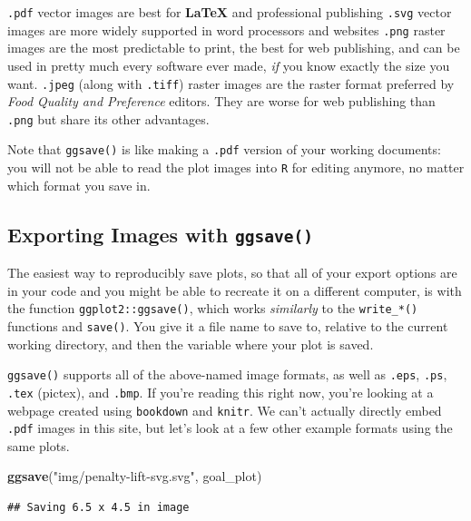 \documentclass[
]{book}
\newenvironment{Shaded}{\begin{snugshade}}{\end{snugshade}}
\newcommand{\FunctionTok}[1]{\textcolor[rgb]{0.13,0.29,0.53}{\textbf{#1}}}
\newcommand{\NormalTok}[1]{#1}
\newcommand{\StringTok}[1]{\textcolor[rgb]{0.31,0.60,0.02}{#1}}
\begin{document}
\texttt{.pdf} vector images are best for \textbf{LaTeX} and professional publishing
\texttt{.svg} vector images are more widely supported in word processors and websites
\texttt{.png} raster images are the most predictable to print, the best for web publishing, and can be used in pretty much every software ever made, \emph{if} you know exactly the size you want.
\texttt{.jpeg} (along with \texttt{.tiff}) raster images are the raster format preferred by \emph{Food Quality and Preference} editors. They are worse for web publishing than \texttt{.png} but share its other advantages.

Note that \texttt{ggsave()} is like making a \texttt{.pdf} version of your working documents: you will not be able to read the plot images into \texttt{R} for editing anymore, no matter which format you save in.

\hypertarget{exporting-images-with-ggsave}{%
\subsection{\texorpdfstring{Exporting Images with \texttt{ggsave()}}{Exporting Images with ggsave()}}\label{exporting-images-with-ggsave}}

The easiest way to reproducibly save plots, so that all of your export options are in your code and you might be able to recreate it on a different computer, is with the function \texttt{ggplot2::ggsave()}, which works \emph{similarly} to the \texttt{write\_*()} functions and \texttt{save()}. You give it a file name to save to, relative to the current working directory, and then the variable where your plot is saved.

\texttt{ggsave()} supports all of the above-named image formats, as well as \texttt{.eps}, \texttt{.ps}, \texttt{.tex} (pictex), and \texttt{.bmp}. If you're reading this right now, you're looking at a webpage created using \texttt{bookdown} and \texttt{knitr}. We can't actually directly embed \texttt{.pdf} images in this site, but let's look at a few other example formats using the same plots.

\begin{Shaded}
\begin{Highlighting}[]
\FunctionTok{ggsave}\NormalTok{(}\StringTok{"img/penalty{-}lift{-}svg.svg"}\NormalTok{, goal\_plot)}
\end{Highlighting}
\end{Shaded}

\begin{verbatim}
## Saving 6.5 x 4.5 in image
\end{verbatim}
\end{document}
